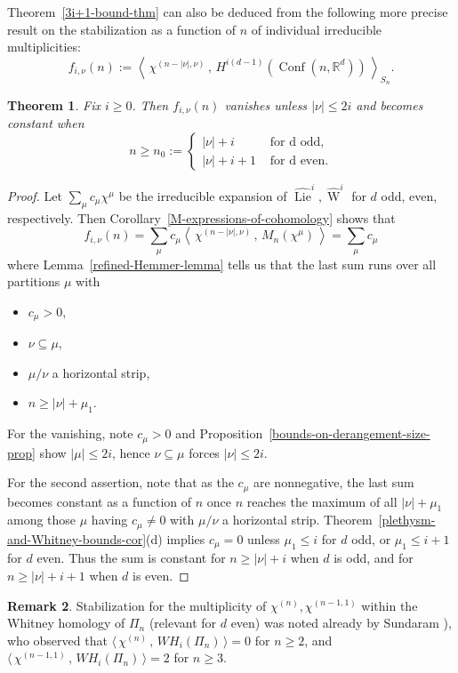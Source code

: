 \documentclass[12pt]{amsart}
\theoremstyle{plain}
\newtheorem{thm}{Theorem}[section]
\theoremstyle{definition}
\newtheorem{remark}[thm]{Remark}
\begin{document}
Theorem~\ref{3i+1-bound-thm} can also be
deduced from the following more precise result
on the stabilization as a function of $n$ of
individual irreducible multiplicities:
$$
f_{i,\nu}(n)
:=\left\langle 
\,
\chi^{(n-|\nu|,\nu)} \, , \, H^{i(d-1)}({{\operatorname{Conf}}}(n,{{\mathbb{R}}}^d))
\,
\right\rangle_{S_n}.
$$

\begin{thm}
\label{refined-3i+1-bound-thm}
Fix $i \geq 0$.  Then $f_{i,\nu}(n)$ vanishes
unless $|\nu| \leq 2i$ and becomes constant when
$$
n \geq n_0:=
\begin{cases} 
   |\nu|+i & \text{ for d odd},\\
   |\nu|+i+1 & \text{ for d even}.
\end{cases}
$$
\end{thm}

\begin{proof}
Let $\sum_{\mu} c_\mu \chi^\mu$  be
the irreducible expansion 
of $\widehat{{\operatorname{Lie}}}^i, \widehat{{\operatorname{W}}}^i$ for $d$ odd, even, respectively.
Then Corollary~\ref{M-expressions-of-cohomology} shows that
$$
f_{i,\nu}(n)
=\sum_{\mu} c_\mu
 \left\langle \, \chi^{(n-|\nu|,\nu)} \, , \, M_n(\chi^\mu) \, \right\rangle 
=\sum_{\mu} c_\mu 
$$
where Lemma~\ref{refined-Hemmer-lemma} tells us that 
the last sum runs over all partitions $\mu$ with
\begin{itemize}
\item $c_\mu > 0$,
\item $\nu \subseteq \mu$,
\item $\mu/\nu$ a horizontal strip,
\item $n \geq |\nu|+\mu_1$.
\end{itemize}
For the vanishing, note $c_\mu>0$ and
Proposition~\ref{bounds-on-derangement-size-prop} show $|\mu| \leq 2i$,
hence $\nu \subseteq \mu$ forces $|\nu| \leq 2i$.

For the second assertion, note that
as the $c_\mu$ are nonnegative, the last sum
becomes constant as a function of $n$
once $n$ reaches the maximum of all
$|\nu|+\mu_1$ among those $\mu$ having $c_\mu \neq 0$
with $\mu/\nu$ a horizontal strip.
Theorem~\ref{plethysm-and-Whitney-bounds-cor}(d)
implies $c_\mu= 0$ unless $\mu_1 \leq i$ for $d$ odd, or $\mu_1 \leq  i+1$
for $d$ even.  Thus the sum is
constant for $n \geq |\nu|+i$ when $d$ is odd, and for 
$n \geq |\nu|+i+1$ when $d$ is even.
\end{proof}

\begin{remark}
Stabilization for the multiplicity of $\chi^{(n)}, \chi^{(n-1,1)}$
within the Whitney homology of $\Pi_n$ (relevant for $d$ even)
was noted already by Sundaram \cite[Prop 1.9, Corollary 2.3(i)]{Sundaram}),
who observed that
$
\langle \, \chi^{(n)} \, , \, WH_i(\Pi_n) \, \rangle =0
$
for $n \geq 2$, and
$
\langle \, \chi^{(n-1,1)} \, , \, WH_i(\Pi_n) \, \rangle=2
$
for $n \geq 3$.
\end{remark}
\end{document}
